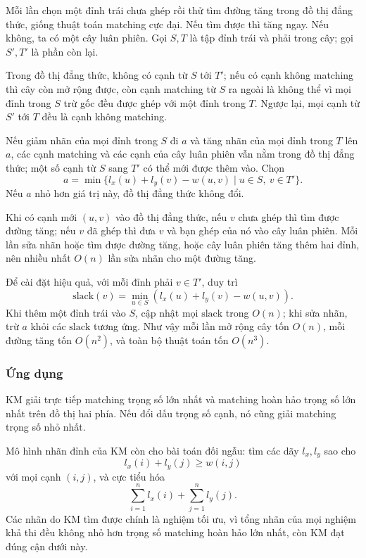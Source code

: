 \documentclass[11pt]{article}
\begin{document}
Mỗi lần chọn một đỉnh trái chưa ghép rồi thử tìm đường tăng trong đồ thị đẳng
thức, giống thuật toán matching cực đại. Nếu tìm được thì tăng ngay. Nếu không,
ta có một cây luân phiên. Gọi \(S,T\) là tập đỉnh trái và phải trong cây; gọi
\(S',T'\) là phần còn lại.

Trong đồ thị đẳng thức, không có cạnh từ \(S\) tới \(T'\); nếu có cạnh không
matching thì cây còn mở rộng được, còn cạnh matching từ \(S\) ra ngoài là không
thể vì mọi đỉnh trong \(S\) trừ gốc đều được ghép với một đỉnh trong \(T\).
Ngược lại, mọi cạnh từ \(S'\) tới \(T\) đều là cạnh không matching.

Nếu giảm nhãn của mọi đỉnh trong \(S\) đi \(a\) và tăng nhãn của mọi đỉnh trong
\(T\) lên \(a\), các cạnh matching và các cạnh của cây luân phiên vẫn nằm trong
đồ thị đẳng thức; một số cạnh từ \(S\) sang \(T'\) có thể mới được thêm vào.
Chọn
\[
  a=\min\{l_x(u)+l_y(v)-w(u,v)\mid u\in S,\ v\in T'\}.
\]
Nếu \(a\) nhỏ hơn giá trị này, đồ thị đẳng thức không đổi.

Khi có cạnh mới \((u,v)\) vào đồ thị đẳng thức, nếu \(v\) chưa ghép thì tìm được
đường tăng; nếu \(v\) đã ghép thì đưa \(v\) và bạn ghép của nó vào cây luân
phiên. Mỗi lần sửa nhãn hoặc tìm được đường tăng, hoặc cây luân phiên tăng thêm
hai đỉnh, nên nhiều nhất \(O(n)\) lần sửa nhãn cho một đường tăng.

Để cài đặt hiệu quả, với mỗi đỉnh phải \(v\in T'\), duy trì
\[
  \mathrm{slack}(v)=\min_{u\in S}(l_x(u)+l_y(v)-w(u,v)).
\]
Khi thêm một đỉnh trái vào \(S\), cập nhật mọi \(\mathrm{slack}\) trong \(O(n)\);
khi sửa nhãn, trừ \(a\) khỏi các \(\mathrm{slack}\) tương ứng. Như vậy mỗi lần
mở rộng cây tốn \(O(n)\), mỗi đường tăng tốn \(O(n^2)\), và toàn bộ thuật toán
tốn \(O(n^3)\).

\subsubsection{Ứng dụng}

KM giải trực tiếp matching trọng số lớn nhất và matching hoàn hảo trọng số lớn
nhất trên đồ thị hai phía. Nếu đổi dấu trọng số cạnh, nó cũng giải matching
trọng số nhỏ nhất.

Mô hình nhãn đỉnh của KM còn cho bài toán đối ngẫu: tìm các dãy \(l_x,l_y\) sao
cho
\[
  l_x(i)+l_y(j)\ge w(i,j)
\]
với mọi cạnh \((i,j)\), và cực tiểu hóa
\[
  \sum_{i=1}^{n}l_x(i)+\sum_{j=1}^{n}l_y(j).
\]
Các nhãn do KM tìm được chính là nghiệm tối ưu, vì tổng nhãn của mọi nghiệm khả
thi đều không nhỏ hơn trọng số matching hoàn hảo lớn nhất, còn KM đạt đúng cận
dưới này.
\end{document}
